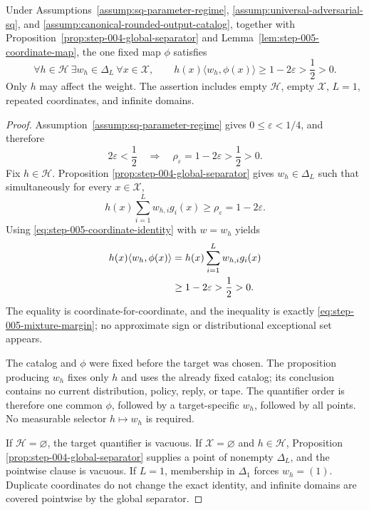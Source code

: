 \begin{proposition}
\label{prop:step-005-exact-signs}
Under Assumptions~\ref{assump:sq-parameter-regime},
\ref{assump:universal-adversarial-sq}, and
\ref{assump:canonical-rounded-output-catalog}, together with
Proposition~\ref{prop:step-004-global-separator} and
Lemma~\ref{lem:step-005-coordinate-map}, the one fixed map \(\phi\) satisfies
\begin{equation}
\forall h\in\mathcal H\ \exists w_h\in\Delta_L\ \forall x\in\mathcal X,
\qquad
h(x)\langle w_h,\phi(x)\rangle
\ge1-2\varepsilon>\frac12>0.
\label{eq:step-005-exact-signs}
\end{equation}
Only \(h\) may affect the weight.  The assertion includes empty
\(\mathcal H\), empty \(\mathcal X\), \(L=1\), repeated coordinates, and
infinite domains.
\end{proposition}

\begin{proof}
Assumption~\ref{assump:sq-parameter-regime} gives
\(0\le\varepsilon<1/4\), and therefore
\begin{equation}
2\varepsilon<\frac12
\quad\Longrightarrow\quad
\rho_{\varepsilon}=1-2\varepsilon>\frac12>0.
\label{eq:step-005-positive-margin}
\end{equation}
Fix \(h\in\mathcal H\).  Proposition
\ref{prop:step-004-global-separator} gives \(w_h\in\Delta_L\) such that
simultaneously for every \(x\in\mathcal X\),
\begin{equation}
h(x)\sum_{i=1}^Lw_{h,i}g_i(x)
\ge\rho_{\varepsilon}=1-2\varepsilon.
\label{eq:step-005-mixture-margin}
\end{equation}
Using \eqref{eq:step-005-coordinate-identity} with \(w=w_h\) yields
\begin{align}
h(x)\langle w_h,\phi(x)\rangle
&=h(x)\sum_{i=1}^Lw_{h,i}g_i(x) \notag\\
&\ge1-2\varepsilon
>\frac12>0.
\label{eq:step-005-score-margin}
\end{align}
The equality is coordinate-for-coordinate, and the inequality is exactly
\eqref{eq:step-005-mixture-margin}; no approximate sign or distributional
exceptional set appears.

The catalog and \(\phi\) were fixed before the target was chosen.  The
proposition producing \(w_h\) fixes only \(h\) and uses the already fixed
catalog; its conclusion contains no current distribution, policy, reply, or
tape.  The quantifier order is therefore one common \(\phi\), followed by a
target-specific \(w_h\), followed by all points.  No measurable selector
\(h\mapsto w_h\) is required.

If \(\mathcal H=\varnothing\), the target quantifier is vacuous.  If
\(\mathcal X=\varnothing\) and \(h\in\mathcal H\), Proposition
\ref{prop:step-004-global-separator} supplies a point of nonempty
\(\Delta_L\), and the pointwise clause is vacuous.  If \(L=1\), membership
in \(\Delta_1\) forces \(w_h=(1)\).  Duplicate coordinates do not change
the exact identity, and infinite domains are covered pointwise by the global
separator.
\end{proof}


